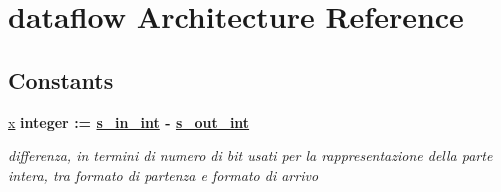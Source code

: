 \hypertarget{classtruncate_1_1dataflow}{\section{dataflow Architecture Reference}
\label{classtruncate_1_1dataflow}
}
\subsection*{Constants}
 \begin{DoxyCompactItemize}
\item 
\hypertarget{classtruncate_1_1dataflow_ga63701d8af27da7452a7588efcff357bc}{\hyperlink{group___truncation_ga63701d8af27da7452a7588efcff357bc}{x} {\bfseries \textcolor{vhdlchar}{integer}\textcolor{vhdlchar}{ }\textcolor{vhdlchar}{ }\textcolor{vhdlchar}{\+:}\textcolor{vhdlchar}{=}\textcolor{vhdlchar}{ }\textcolor{vhdlchar}{ }\textcolor{vhdlchar}{ }\textcolor{vhdlchar}{ }{\bfseries \hyperlink{group___truncation_gabe72b503b8140ab0d84911165e959b53}{s\+\_\+in\+\_\+int}} \textcolor{vhdlchar}{-\/}\textcolor{vhdlchar}{ }\textcolor{vhdlchar}{ }\textcolor{vhdlchar}{ }{\bfseries \hyperlink{group___truncation_ga4ca792ca981e2f9d82bf36d9c82c08af}{s\+\_\+out\+\_\+int}} \textcolor{vhdlchar}{ }} }\label{classtruncate_1_1dataflow_ga63701d8af27da7452a7588efcff357bc}

\begin{DoxyCompactList}\small\item\em differenza, in termini di numero di bit usati per la rappresentazione della parte intera, tra formato di partenza e formato di arrivo \end{DoxyCompactList}\end{DoxyCompactItemize}
